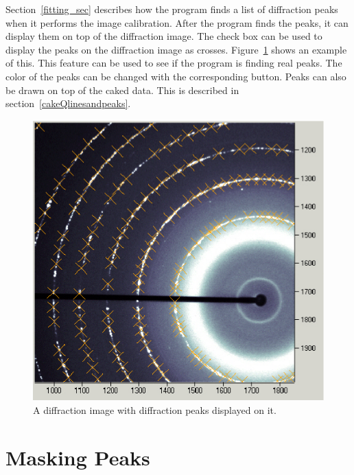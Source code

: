 Section~\ref{fitting_sec} describes how the 
program finds a list of diffraction peaks 
when it performs the image calibration.  
After the program finds the peaks, it can display 
them on top of the diffraction image. 
The  check box can be used to 
display the peaks on the diffraction image as crosses. 
Figure~\ref{peaks_on_diffraction_image} shows 
an example of this. This feature can be used
to see if the program is finding real peaks.
The color of the peaks can be changed with the 
corresponding  button.  
Peaks can also be drawn on top of the caked data. This 
is described in section~\ref{cakeQlinesandpeaks}.

\begin{figure}
    \centering
    \includegraphics[scale=.75]
    {figures/peaks_on_diffraction_image.eps}
    \caption{A diffraction image with diffraction peaks 
    displayed on it.}
    \label{peaks_on_diffraction_image}
\end{figure}

\section{Masking Peaks}

